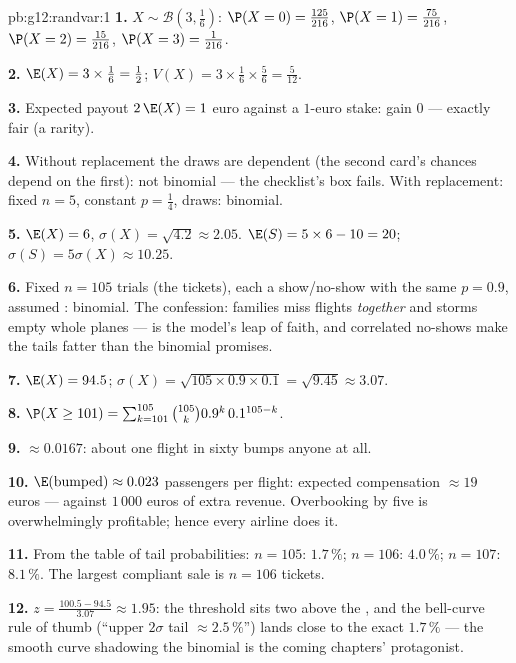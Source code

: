\begin{solution}{pb:g12:randvar:1}
\textbf{1.} $X \sim \mathcal B\!\left(3, \frac16\right)$:
$\P(X = 0) = \frac{125}{216}$,
$\P(X = 1) = \frac{75}{216}$,
$\P(X = 2) = \frac{15}{216}$,
$\P(X = 3) = \frac{1}{216}$.

\textbf{2.} $\E(X) = 3 \times \frac16 = \frac12$;
$V(X) = 3 \times \frac16 \times \frac56 = \frac{5}{12}$.

\textbf{3.} Expected payout $2\,\E(X) = 1$ euro against a
$1$-euro stake: gain $0$ --- exactly fair (a rarity).

\textbf{4.} Without replacement the draws are dependent (the
second card's chances depend on the first): not binomial ---
the checklist's  box fails. With replacement:
fixed $n = 5$, constant $p = \frac14$,  draws:
binomial.

\textbf{5.} $\E(X) = 6$, $\sigma(X) = \sqrt{4.2} \approx
2.05$. $\E(S) = 5 \times 6 - 10 = 20$;
$\sigma(S) = 5\sigma(X) \approx 10.25$.

\textbf{6.} Fixed $n = 105$ trials (the tickets), each a
show/no-show with the same $p = 0.9$, assumed :
binomial. The confession: families miss flights
\emph{together} and storms empty whole planes --- 
is the model's leap of faith, and correlated no-shows make
the tails fatter than the binomial promises.

\textbf{7.} $\E(X) = 94.5$;
$\sigma(X) = \sqrt{105 \times 0.9 \times 0.1} =
\sqrt{9.45} \approx 3.07$.

\textbf{8.} $\P(X \geq 101) = \sum_{k=101}^{105}
\binom{105}{k} 0.9^k\, 0.1^{105 - k}$.

\textbf{9.} $\approx 0.0167$: about one flight in sixty
bumps anyone at all.

\textbf{10.} $\E(\text{bumped}) \approx 0.023$ passengers per
flight: expected compensation $\approx 19$ euros --- against
$1\,000$ euros of extra revenue. Overbooking by five is
overwhelmingly profitable; hence every airline does it.

\textbf{11.} From the table of tail probabilities:
$n = 105$: $1.7\,\%$; $n = 106$: $4.0\,\%$; $n = 107$:
$8.1\,\%$. The largest compliant sale is $n = 106$ tickets.

\textbf{12.} $z = \frac{100.5 - 94.5}{3.07} \approx 1.95$:
the threshold sits two  above the ,
and the bell-curve rule of thumb (``upper $2\sigma$ tail
$\approx 2.5\,\%$'') lands close to the exact $1.7\,\%$ ---
the smooth curve shadowing the binomial is the coming
chapters' protagonist.


\end{solution}
